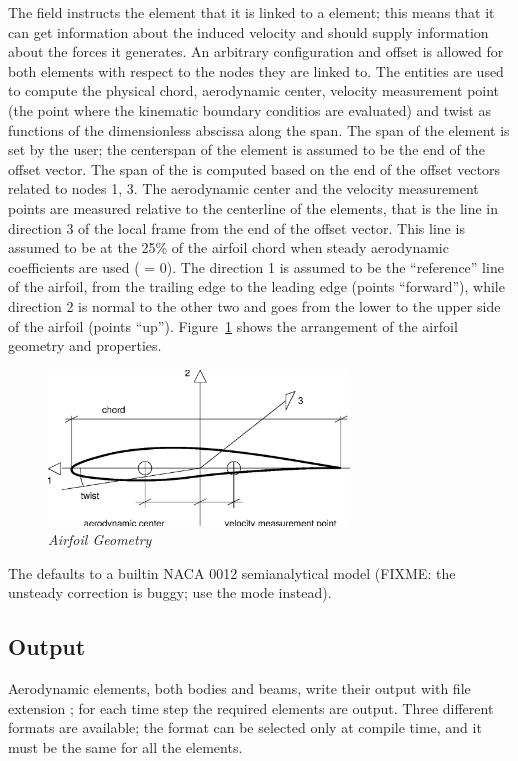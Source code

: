 The field  instructs the element that it is linked to a 
 element; this means that it can get information about the
induced velocity and should supply information about the forces it generates.
An arbitrary configuration and offset is allowed for both elements with
respect to the nodes they are linked to. 
The  entities are used to compute the physical chord,
aerodynamic center, velocity measurement point (the point where the
kinematic boundary conditios are evaluated) and twist as functions 
of the dimensionless abscissa along the span.
The span of the  element is set by the user; the
centerspan of the element is assumed to be the end of the offset vector.
The span of the  is computed based on the end of the
offset vectors related to nodes 1, 3.
The aerodynamic center and the velocity measurement points are measured
relative to the centerline of the elements, that is the line in direction 3
of the local frame from the end of the offset vector.
This line is assumed to be at the 25\% of the airfoil chord when steady
aerodynamic coefficients are used ( = 0).
The direction 1 is assumed to be the ``reference'' line of the airfoil, 
from the trailing edge to the leading edge (points ``forward''),
while direction 2 is normal to the other two and goes from the lower 
to the upper side of the airfoil (points ``up''). 
Figure~\ref{fig:AIRFOIL} shows the arrangement of the airfoil geometry 
and properties.

\begin{figure}[h]
  \centering
    \includegraphics[width=80mm]{airfoil.eps}
  \caption{\em Airfoil Geometry}\label{fig:AIRFOIL}
\end{figure}

The  defaults to a builtin NACA 0012 semianalytical
model (FIXME: the unsteady correction is buggy; use the  
mode instead).


\subsection{Output}
Aerodynamic elements, both bodies and beams, write their output with file
extension ; for each time step the required elements are output.
Three different formats are available; the format can be selected only at
compile time, and it must be the same for all the elements. 


